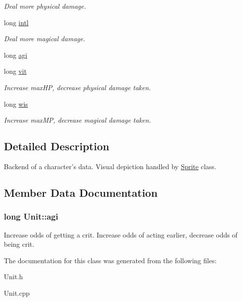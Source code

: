 \begin{DoxyCompactItemize}
\begin{DoxyCompactList}\small\item\em Deal more physical damage. \end{DoxyCompactList}\item 
long \hyperlink{class_unit_a91dbc8f2eb12f1b1ce62263e4e03dc02}{intl}\hypertarget{class_unit_a91dbc8f2eb12f1b1ce62263e4e03dc02}{}\label{class_unit_a91dbc8f2eb12f1b1ce62263e4e03dc02}

\begin{DoxyCompactList}\small\item\em Deal more magical damage. \end{DoxyCompactList}\item 
long \hyperlink{class_unit_acc22dc8845ffb44a9071ab9560704bbd}{agi}
\item 
long \hyperlink{class_unit_a16db72251b952028a99bee4afb1a6ad0}{vit}\hypertarget{class_unit_a16db72251b952028a99bee4afb1a6ad0}{}\label{class_unit_a16db72251b952028a99bee4afb1a6ad0}

\begin{DoxyCompactList}\small\item\em Increase max\+HP, decrease physical damage taken. \end{DoxyCompactList}\item 
long \hyperlink{class_unit_a86ac8a7ba67d41fb6c034cd814167b1d}{wis}\hypertarget{class_unit_a86ac8a7ba67d41fb6c034cd814167b1d}{}\label{class_unit_a86ac8a7ba67d41fb6c034cd814167b1d}

\begin{DoxyCompactList}\small\item\em Increase max\+MP, decrease magical damage taken. \end{DoxyCompactList}\end{DoxyCompactItemize}


\subsection{Detailed Description}
Backend of a character’s data. Visual depiction handled by \hyperlink{class_sprite}{Sprite} class. 

\subsection{Member Data Documentation}
\subsubsection[{\texorpdfstring{agi}{agi}}]{\setlength{\rightskip}{0pt plus 5cm}long Unit\+::agi\hspace{0.3cm}{\ttfamily [protected]}}\hypertarget{class_unit_acc22dc8845ffb44a9071ab9560704bbd}{}\label{class_unit_acc22dc8845ffb44a9071ab9560704bbd}
Increase odds of getting a crit. Increase odds of acting earlier, decrease odds of being crit. 

The documentation for this class was generated from the following files\+:\begin{DoxyCompactItemize}
\item 
Unit.\+h\item 
Unit.\+cpp\end{DoxyCompactItemize}

